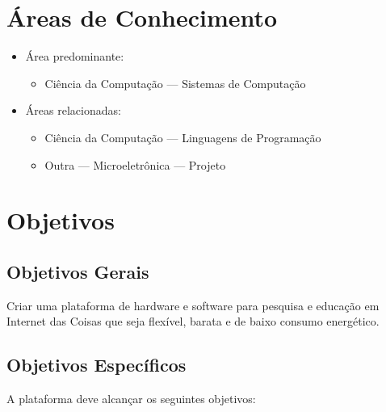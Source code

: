 \documentclass[titlepage,12pt]{article}
\begin{document}

\section{Áreas de Conhecimento}

\begin{itemize}
\item Área predominante:
    \begin{itemize}
    \item Ciência da Computação --- Sistemas de Computação     
    \end{itemize}
\item Áreas relacionadas:
    \begin{itemize}
    \item Ciência da Computação --- Linguagens de Programação
    \item Outra --- Microeletrônica --- Projeto
    \end{itemize}
\end{itemize}


\section{ Objetivos }

\subsection{ Objetivos Gerais }

Criar uma plataforma de hardware e software para pesquisa e educação em
Internet das Coisas que seja flexível, barata e de baixo consumo energético.

\subsection{ Objetivos Específicos }

A plataforma deve alcançar os seguintes objetivos:
\end{document}

